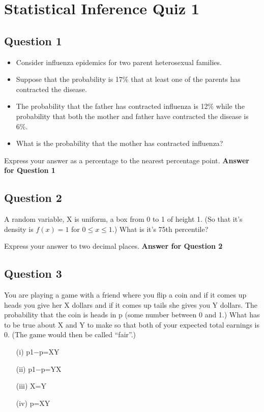 \documentclass[]{article}
\begin{document}
\section{Statistical Inference Quiz 1}


\subsection{Question 1}

\begin{itemize}
\item Consider influenza epidemics for two parent heterosexual families. 
\item Suppose that the probability is 17\% that at least one of the parents has contracted the disease. 
\item The probability that the father has contracted influenza is 12\% while the probability that both the mother and father have contracted the disease is 6\%. 
\item What is the probability that the mother has contracted influenza?
\end{itemize}
Express your answer as a percentage to the nearest percentage point.
\textbf{Answer for Question 1}
\subsection{Question 2}
A random variable, X is uniform, a box from 0 to 1 of height 1. (So that it's density is $f(x)=1$ for $0\leq x\leq 1$.) What is it's 75th percentile?

Express your answer to two decimal places.
\textbf{Answer for Question 2}
\subsection{Question 3}
You are playing a game with a friend where you flip a coin and if it comes up heads you give her X dollars and if it comes up tails she gives you Y dollars. 
The probability that the coin is heads in p (some number between 0 and 1.) 
What has to be true about X and Y to make so that both of your expected total earnings is 0. 
(The game would then be called “fair”.)

\begin{itemize}
\item[(i)] p1−p=XY
\item[(ii)] p1−p=YX
\item[(iii)] X=Y
\item[(iv)] p=XY
\end{itemize}
\end{document}
